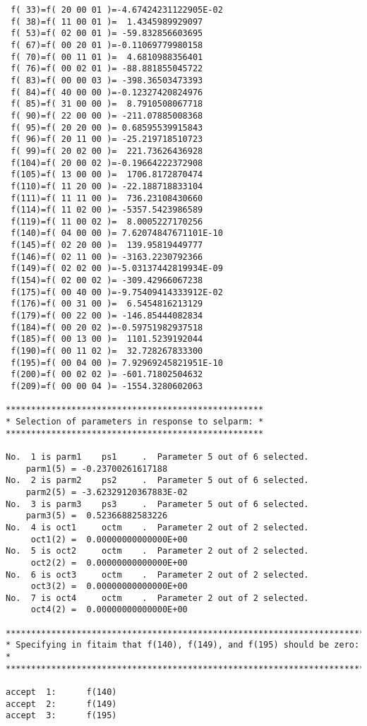 \begin{footnotesize}
\begin{verbatim}
 f( 33)=f( 20 00 01 )=-4.67424231122905E-02
 f( 38)=f( 11 00 01 )=  1.4345989929097
 f( 53)=f( 02 00 01 )= -59.832856603695
 f( 67)=f( 00 20 01 )=-0.11069779980158
 f( 70)=f( 00 11 01 )=  4.6810988356401
 f( 76)=f( 00 02 01 )= -88.881855045722
 f( 83)=f( 00 00 03 )= -398.36503473393
 f( 84)=f( 40 00 00 )=-0.12327420824976
 f( 85)=f( 31 00 00 )=  8.7910508067718
 f( 90)=f( 22 00 00 )= -211.07885008368
 f( 95)=f( 20 20 00 )= 0.68595539915843
 f( 96)=f( 20 11 00 )= -25.219718510723
 f( 99)=f( 20 02 00 )=  221.73626436928
 f(104)=f( 20 00 02 )=-0.19664222372908
 f(105)=f( 13 00 00 )=  1706.8172870474
 f(110)=f( 11 20 00 )= -22.188718833104
 f(111)=f( 11 11 00 )=  736.23108430660
 f(114)=f( 11 02 00 )= -5357.5423986589
 f(119)=f( 11 00 02 )=  8.0005227170256
 f(140)=f( 04 00 00 )= 7.62074847671101E-10
 f(145)=f( 02 20 00 )=  139.95819449777
 f(146)=f( 02 11 00 )= -3163.2230792366
 f(149)=f( 02 02 00 )=-5.03137442819934E-09
 f(154)=f( 02 00 02 )= -309.42966067238
 f(175)=f( 00 40 00 )=-9.75409414333912E-02
 f(176)=f( 00 31 00 )=  6.5454816213129
 f(179)=f( 00 22 00 )= -146.85444082834
 f(184)=f( 00 20 02 )=-0.59751982937518
 f(185)=f( 00 13 00 )=  1101.5239192044
 f(190)=f( 00 11 02 )=  32.728267833300
 f(195)=f( 00 04 00 )= 7.92969245821951E-10
 f(200)=f( 00 02 02 )= -601.71802504632
 f(209)=f( 00 00 04 )= -1554.3280602063

***************************************************
* Selection of parameters in response to selparm: *
***************************************************

No.  1 is parm1    ps1     .  Parameter 5 out of 6 selected.
    parm1(5) = -0.23700261617188
No.  2 is parm2    ps2     .  Parameter 5 out of 6 selected.
    parm2(5) = -3.62329120367883E-02
No.  3 is parm3    ps3     .  Parameter 5 out of 6 selected.
    parm3(5) =  0.52366882583226
No.  4 is oct1     octm    .  Parameter 2 out of 2 selected.
     oct1(2) =  0.00000000000000E+00
No.  5 is oct2     octm    .  Parameter 2 out of 2 selected.
     oct2(2) =  0.00000000000000E+00
No.  6 is oct3     octm    .  Parameter 2 out of 2 selected.
     oct3(2) =  0.00000000000000E+00
No.  7 is oct4     octm    .  Parameter 2 out of 2 selected.
     oct4(2) =  0.00000000000000E+00

************************************************************************
* Specifying in fitaim that f(140), f(149), and f(195) should be zero: *
************************************************************************

accept  1:      f(140)
accept  2:      f(149)
accept  3:      f(195)


\end{verbatim}
\end{footnotesize}
